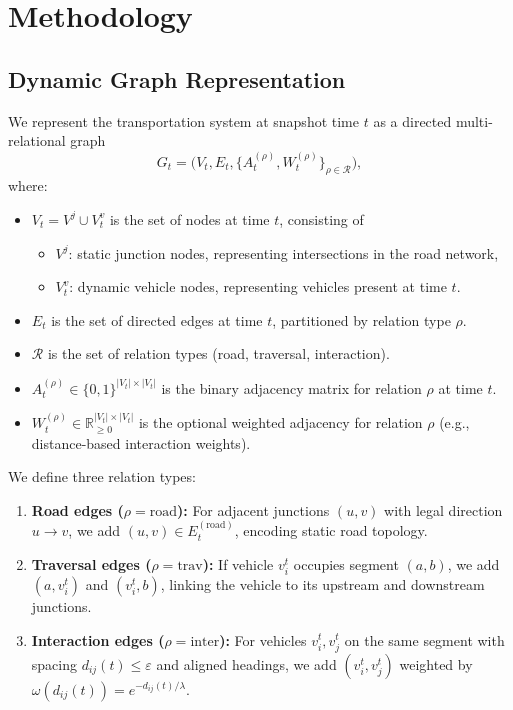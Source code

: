 \section{Methodology}

\subsection{Dynamic Graph Representation}
We represent the transportation system at snapshot time $t$ as a directed multi-relational graph
\[
G_t = \big(V_t, E_t, \{A_t^{(\rho)}, W_t^{(\rho)}\}_{\rho\in\mathcal{R}}\big),
\]
where:
\begin{itemize}
    \item $V_t = V^j \cup V_t^v$ is the set of nodes at time $t$, consisting of
        \begin{itemize}
            \item $V^j$: static junction nodes, representing intersections in the road network,
            \item $V_t^v$: dynamic vehicle nodes, representing vehicles present at time $t$.
        \end{itemize}
    \item $E_t$ is the set of directed edges at time $t$, partitioned by relation type $\rho$.
    \item $\mathcal{R}$ is the set of relation types (road, traversal, interaction).
    \item $A_t^{(\rho)} \in \{0,1\}^{|V_t|\times |V_t|}$ is the binary adjacency matrix for relation $\rho$ at time $t$.
    \item $W_t^{(\rho)} \in \mathbb{R}_{\ge 0}^{|V_t|\times |V_t|}$ is the optional weighted adjacency for relation $\rho$ (e.g., distance-based interaction weights).
\end{itemize}

We define three relation types:
\begin{enumerate}
    \item \textbf{Road edges ($\rho=\text{road}$):} For adjacent junctions $(u,v)$ with legal direction $u\!\to\!v$, we add $(u,v)\in E_t^{(\text{road})}$, encoding static road topology.
    \item \textbf{Traversal edges ($\rho=\text{trav}$):} If vehicle $v_i^t$ occupies segment $(a,b)$, we add $(a,v_i^t)$ and $(v_i^t,b)$, linking the vehicle to its upstream and downstream junctions.
    \item \textbf{Interaction edges ($\rho=\text{inter}$):} For vehicles $v_i^t,v_j^t$ on the same segment with spacing $d_{ij}(t)\le\varepsilon$ and aligned headings, we add $(v_i^t,v_j^t)$ weighted by $\omega(d_{ij}(t)) = e^{-d_{ij}(t)/\lambda}$.
\end{enumerate}

